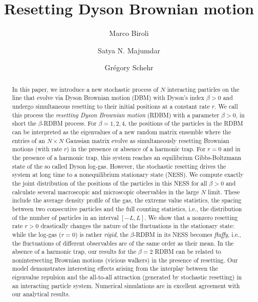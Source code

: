 \documentclass[onecolumn,superscriptaddress,
 amsmath,amssymb,
 aps,
 prd,
]{revtex4-1}
\begin{document}
\title{Resetting Dyson Brownian motion}%
\author{Marco Biroli}
\author{Satya N. Majumdar}
\author{Gr\'egory Schehr}





\begin{abstract}

In this paper, we introduce a new stochastic process of $N$ interacting particles on the line that evolve via Dyson Brownian motion (DBM) with Dyson's index $\beta > 0$ and undergo simultaneous resetting to their initial positions at a constant rate $r$. We call this process the 
{\it resetting Dyson Brownian motion} (RDBM) with a parameter $\beta > 0$, in short the $\beta$-RDBM process. For $\beta = 1,2,4$, the positions of the particles in the RDBM can be interpreted as the eigenvalues of a new random matrix ensemble where the entries of an $N \times N$ Gaussian matrix evolve as simultaneously resetting Brownian motions (with rate $r$) in the presence or absence of a harmonic trap. For $r=0$ and in the presence of a harmonic trap, this system reaches an equilibrium Gibbs-Boltzmann state of the so called Dyson log-gas. However, the stochastic resetting drives the system at long time to a nonequilibrium stationary state (NESS). We compute exactly the joint distribution of the positions of the particles in this NESS for all $\beta>0$ and calculate several macroscopic and microscopic observables in the large $N$ limit. These include the average density profile of the gas, the extreme value statistics, the spacing between two consecutive particles and the full counting statistics, i.e., the distribution of the number of particles in an interval $[-L,L]$. We show that a nonzero resetting rate $r>0$ drastically changes the nature of the fluctuations in the stationary state: while the log-gas ($r=0$) is rather {\it rigid}, the $\beta$-RDBM in its NESS becomes {\it fluffy}, i.e., the fluctuations of different observables are of the same order as their mean. In the absence of a harmonic trap, our results for the $\beta = 2$ RDBM can be related to nonintersecting Brownian motions (vicious walkers) in the presence of resetting. Our model demonstrates interesting effects arising from the interplay between the eigenvalue repulsion and the all-to-all attraction (generated by stochastic resetting) in an interacting particle system. Numerical simulations are in excellent agreement with our analytical results.
 \end{abstract}
\end{document}
